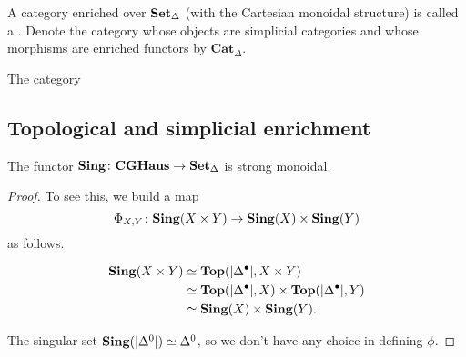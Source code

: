 \documentclass[main.tex]{subfiles}
\begin{document}
\begin{definition}
  \label{def:simplicial_category}
  A category enriched over $\operatorname{\mathbf{Set}_{\Delta}}$ (with the Cartesian monoidal structure) is called a . Denote the category whose objects are simplicial categories and whose morphisms are enriched functors by $\mathbf{Cat}_{\Delta}$.
\end{definition}

\begin{theorem}
  The category
\end{theorem}

\subsection{Topological and simplicial enrichment}
\label{ssc:topological_and_simplicial_enrichment}

\begin{lemma}
  The functor $\mathbf{Sing}\colon \mathbf{CGHaus} \to \operatorname{\mathbf{Set}_{\Delta}}$ is strong monoidal.
\end{lemma}
\begin{proof}
  To see this, we build a map
  \begin{equation*}
    \Phi_{X, Y}\colon \mathbf{Sing}(X \times Y) \to \mathbf{Sing}(X) \times \mathbf{Sing}(Y)
  \end{equation*}
  as follows.

  \begin{align*}
    \mathbf{Sing}(X \times Y) &\simeq \mathbf{Top}({| \Delta^{\bullet} |}, X \times Y) \\
    &\simeq \mathbf{Top}({| \Delta^{\bullet} |}, X) \times \mathbf{Top}({| \Delta^{\bullet} |}, Y) \\
    &\simeq \mathbf{Sing}(X) \times \mathbf{Sing}(Y).
  \end{align*}

  The singular set $\mathbf{Sing}({| \Delta^{0} |}) \simeq \Delta^{0}$, so we don't have any choice in defining $\phi$.
\end{proof}
\end{document}
